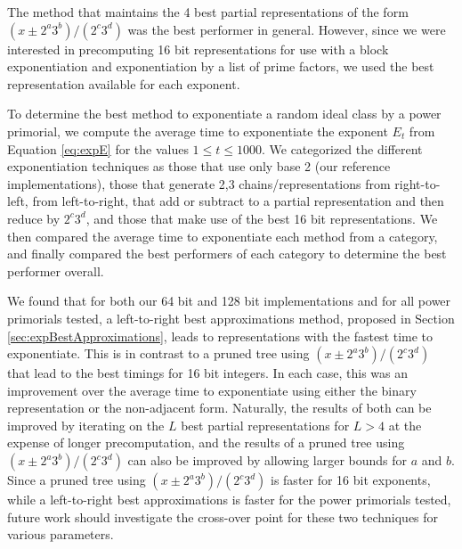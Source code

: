 \documentclass{ucalgthes1}
\theoremstyle{definition}
\begin{document}
The method that maintains the 4 best partial representations of the form $(x \pm 2^a3^b)/(2^c3^d)$ was the best performer in general.  However, since we were interested in precomputing 16 bit representations for use with a block exponentiation and exponentiation by a list of prime factors, we used the best representation available for each exponent.

To determine the best method to exponentiate a random ideal class by a power primorial, we compute the average time to exponentiate the exponent $E_t$ from Equation \eqref{eq:expE} for the values $1 \le t \le 1000$.  We categorized the different exponentiation techniques as those that use only base 2 (our reference implementations), those that generate 2,3 chains/representations from right-to-left, from left-to-right, that add or subtract to a partial representation and then reduce by $2^c3^d$, and those that make use of the best 16 bit representations.  We then compared the average time to exponentiate each method from a category, and finally compared the best performers of each category to determine the best performer overall.

We found that for both our 64 bit and 128 bit implementations and for all power primorials tested, a left-to-right best approximations method, proposed in Section \ref{sec:expBestApproximations}, leads to representations with the fastest time to exponentiate.  This is in contrast to a pruned tree using $(x \pm 2^a3^b)/(2^c3^d)$ that lead to the best timings for 16 bit integers.  In each case, this was an improvement over the average time to exponentiate using either the binary representation or the non-adjacent form.  Naturally, the results of both can be improved by iterating on the $L$ best partial representations for $L > 4$ at the expense of longer precomputation, and the results of a pruned tree using $(x \pm 2^a3^b)/(2^c3^d)$ can also be improved by allowing larger bounds for $a$ and $b$.  Since a pruned tree using $(x \pm 2^a3^b)/(2^c3^d)$ is faster for 16 bit exponents, while a left-to-right best approximations is faster for the power primorials tested, future work should investigate the cross-over point for these two techniques for various parameters.
\end{document}
